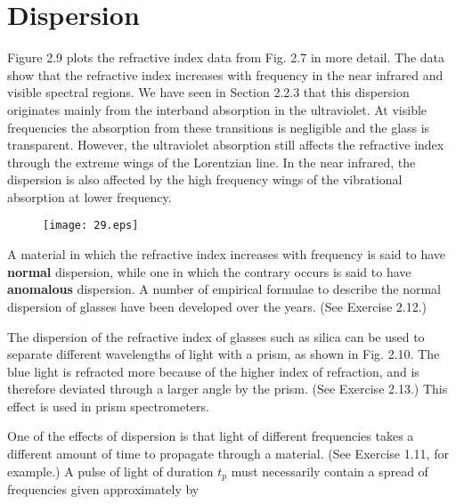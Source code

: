 \documentclass[12pt]{book}
\begin{document}
\section{Dispersion}

Figure 2.9 plots the refractive index data from Fig. 2.7 in more detail. The data show that the refractive index increases with frequency in the near infrared and visible spectral regions. We have seen in Section 2.2.3 that this dispersion originates mainly from the interband absorption in the ultraviolet. At visible frequencies the absorption from these transitions is negligible and the glass is transparent. However, the ultraviolet absorption still affects the refractive index through the extreme wings of the Lorentzian line. In the near infrared, the dispersion is also affected by the high frequency wings of the vibrational absorption at lower frequency.
\begin{figure}[htbp]
  \texttt{[image: 29.eps]}\\
  \label{fig:2.9}
\end{figure}

A material in which the refractive index increases with frequency is said to have \textbf{normal} dispersion, while one in which the contrary occurs is said to have \textbf{anomalous} dispersion. A number of empirical formulae to describe the normal dispersion of glasses have been developed over the years. (See Exercise 2.12.)

The dispersion of the refractive index of glasses such as silica can be used to separate different wavelengths of light with a prism, as shown in Fig. 2.10. The blue light is refracted more because of the higher index of refraction, and is therefore deviated through a larger angle by the prism. (See Exercise 2.13.) This effect is used in prism spectrometers.

One of the effects of dispersion is that light of different frequencies takes a different amount of time to propagate through a material. (See Exercise 1.11, for example.) A pulse of light of duration $t_p$ must necessarily contain a spread of frequencies given approximately by
\end{document}
